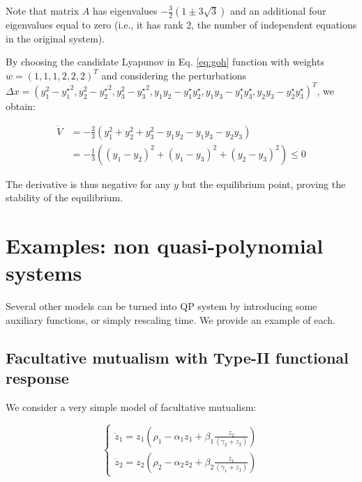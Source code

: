 \documentclass{article}
\begin{document}
Note that matrix \(A\) has eigenvalues
\(-\frac{3}{2}(1 \pm 3 \sqrt{3})\) and an additional four eigenvalues
equal to zero (i.e., it has rank 2, the number of independent equations
in the original system).

By choosing the candidate Lyapunov in Eq. \ref{eq:goh} function with
weights \(w = (1,1,1, 2,2,2)^T\) and considering the perturbations
\(\Delta x = (y_1^2 - {y_1^\star}^2, y_2^2 - {y_2^\star}^2, y_3^2 - {y_3^\star}^2, y_1 y_2 - y_1^\star y_2^\star, y_1 y_3 - y_1^\star y_3^\star, y_2 y_3 - y_2^\star y_3^\star)^T\),
we obtain:

\begin{equation}
\begin{aligned}
\dot{V} &= -\frac{2}{3} \left(y_1^2 + y_2^2 + y_3^2 - y_1 y_2 -y_1 y_3 - y_2 y_3 \right) \\
&=-\frac{1}{3} \left((y_1 - y_2)^2 + (y_1 - y_3)^2 + (y_2 - y_3)^2\right) \leq 0
\end{aligned}
\end{equation}

The derivative is thus negative for any \(y\) but the equilibrium point,
proving the stability of the equilibrium.

\hypertarget{examples-non-quasi-polynomial-systems}{%
\section{Examples: non quasi-polynomial
systems}\label{examples-non-quasi-polynomial-systems}}

Several other models can be turned into QP system by introducing some
auxiliary functions, or simply rescaling time. We provide an example of
each.

\hypertarget{facultative-mutualism-with-type-ii-functional-response}{%
\subsection{Facultative mutualism with Type-II functional
response}\label{facultative-mutualism-with-type-ii-functional-response}}

We consider a very simple model of facultative mutualism:

\begin{equation}
\begin{cases}
\dot{z}_1 = z_1 \left(\rho_1 - \alpha_1 z_1 + \beta_1 \frac{z_2}{(\gamma_2 + z_2)} \right)\\
\dot{z}_2 = z_2 \left(\rho_2 - \alpha_2 z_2 + \beta_2 \frac{z_1}{(\gamma_1 + z_1)} \right)
\end{cases}
\end{equation}
\end{document}
